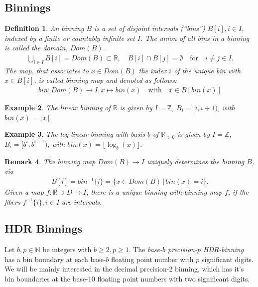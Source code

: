 \documentclass{article}
\theoremstyle{plain}
\newtheorem{definition}{Definition}[section]
\newtheorem{example}[definition]{Example}
\newtheorem{remark}[definition]{Remark}
\newcommand{\IN}{\mathbb{N}}
\newcommand{\IR}{\mathbb{R}}
\newcommand{\IZ}{\mathbb{Z}}
\newcommand{\Union}{\bigcup}
\newcommand{\defn}{\emph} %
\newcommand{\qtext}[1]{\quad\text{#1}\quad} %
\newcommand{\lra}{\longrightarrow}
\newcommand{\floor}[1]{\lfloor#1\rfloor}
\begin{document}
\subsection{Binnings}

\begin{definition}
  An binning $B$ is a set of disjoint intervals (``bins'') $B[i], i\in I$, indexed by a
  finite or countably infinite set $I$.
  The union of all bins in a binning is called the domain, $Dom(B)$.
  \begin{align*}
    \Union_{i \in I} B[i] = Dom(B) \subset \IR,\quad B[i] \cap B[j] = \emptyset \qtext{for} i \neq j \in I.
  \end{align*}
  The map, that associates to $x \in Dom(B)$ the index $i$ of the unique bin with $x \in B[i]$,
  is called \defn{binning map}
  and denoted as follows:
  \begin{align*}
    bin: Dom(B) \lra I, x \mapsto bin(x) \qtext{with} x \in B[bin(x)]
  \end{align*}
\end{definition}

\begin{example}
  The linear binning of $\IR$ is given by $I = \IZ$, $B_i = [i, i+1)$, with $bin(x)=\floor{x}$.
\end{example}

\begin{example}
  The log-linear binning with basis $b$ of $\IR_{>0}$ is given by $I=\IZ$, $B_i = [b^i, b^{i+1})$, with $bin(x)=\floor{\log_b(x)}$.
\end{example}

\begin{remark}
  The binning map $Dom(B) \lra I$ uniquely determines the binning $B$, via
  \begin{align*}
    B[i] = bin^{-1}\{ i \} = \{ x \in Dom(B) \,|\, bin(x) = i \}.
  \end{align*}
  Given a map $f:\IR \supset D \lra I$, there is a unique binning with binning map $f$, if the fibers $f^{-1}\{i\}, i \in I$ are intervals.
\end{remark}

\subsection{HDR Binnings}
\newcommand{\float}{\mathrm{float}}
\newcommand{\bin}{\mathrm{bin}}

Let $b,p \in \IN$ be integers with $b\geq 2, p \geq 1$.
The \defn{base-$b$ precision-$p$ HDR-binning} has a bin boundary at each base-$b$ floating point number with $p$ significant digits.
We will be mainly interested in the decimal precision-2 binning, which has it's bin boundaries at the base-10 floating point numbers with two significant digits.
\end{document}
